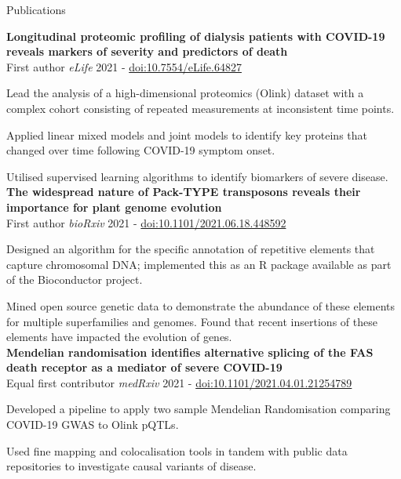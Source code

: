 \documentclass{resume}
\begin{document}
\begin{rSection}{Publications}

\vspace{1pt plus 1pt}
\textbf{Longitudinal proteomic profiling of dialysis patients with COVID-19 reveals markers of severity and predictors of death} \\
First author \hfill  \textit{eLife} 2021 - \href{https://doi.org/10.7554/eLife.64827}{doi:10.7554/eLife.64827}

\vspace{2pt plus 1pt minus 1pt}
\item Lead the analysis of a high-dimensional proteomics (Olink) dataset with a complex cohort consisting of repeated measurements at inconsistent time points.
\item Applied linear mixed models and joint models to identify key proteins that changed over time following COVID-19 symptom onset.
\item Utilised supervised learning algorithms to identify biomarkers of severe disease.\\

\textbf{The widespread nature of Pack-TYPE transposons reveals their importance for plant genome evolution} \\
First author \hfill  \textit{bioRxiv} 2021 - \href{https://doi.org/10.1101/2021.06.18.448592}{doi:10.1101/2021.06.18.448592}

\vspace{2pt plus 1pt minus 1pt}
\item Designed an algorithm for the specific annotation of repetitive elements that capture chromosomal DNA; implemented this as an R package available as part of the Bioconductor project.
\item Mined open source genetic data to demonstrate the abundance of these elements for multiple superfamilies and genomes. Found that recent insertions of these elements have impacted the evolution of genes. \\
 
\textbf{Mendelian randomisation identifies alternative splicing of the FAS death receptor as a mediator of severe COVID-19} \\
Equal first contributor \hfill  \textit{medRxiv} 2021 - \href{https://doi.org/10.1101/2021.04.01.21254789}{doi:10.1101/2021.04.01.21254789}

\vspace{2pt plus 1pt minus 1pt}
\item Developed a pipeline to apply two sample Mendelian Randomisation comparing COVID-19 GWAS to Olink pQTLs. 
\item Used fine mapping and colocalisation tools in tandem with public data repositories to investigate causal variants of disease. \\


\end{rSection}
\end{document}
